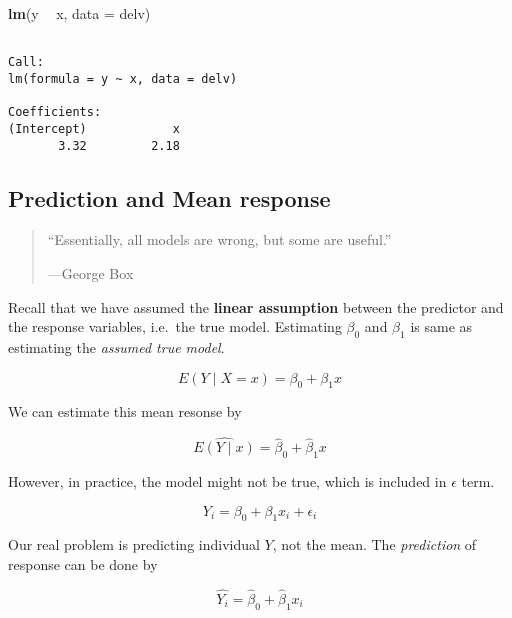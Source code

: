 \documentclass[]{book}
\newenvironment{Shaded}{\begin{snugshade}}{\end{snugshade}}
\newcommand{\KeywordTok}[1]{\textcolor[rgb]{0.13,0.29,0.53}{\textbf{#1}}}
\newcommand{\DataTypeTok}[1]{\textcolor[rgb]{0.13,0.29,0.53}{#1}}
\newcommand{\StringTok}[1]{\textcolor[rgb]{0.31,0.60,0.02}{#1}}
\newcommand{\OperatorTok}[1]{\textcolor[rgb]{0.81,0.36,0.00}{\textbf{#1}}}
\newcommand{\NormalTok}[1]{#1}
\theoremstyle{definition}
\theoremstyle{definition}
\theoremstyle{definition}
\theoremstyle{remark}
\let\BeginKnitrBlock\begin \let\EndKnitrBlock\end
\begin{document}
\begin{Shaded}
\begin{Highlighting}[]
\KeywordTok{lm}\NormalTok{(y }\OperatorTok{~}\StringTok{ }\NormalTok{x, }\DataTypeTok{data =}\NormalTok{ delv)}
\end{Highlighting}
\end{Shaded}

\begin{verbatim}

Call:
lm(formula = y ~ x, data = delv)

Coefficients:
(Intercept)            x  
       3.32         2.18  
\end{verbatim}

\subsection{Prediction and Mean
response}\label{prediction-and-mean-response}

\begin{quote}
``Essentially, all models are wrong, but some are useful.''

---George Box
\end{quote}

Recall that we have assumed the \textbf{linear assumption} between the
predictor and the response variables, i.e.~the true model. Estimating
\(\beta_0\) and \(\beta_1\) is same as estimating the \emph{assumed true
model}.

\BeginKnitrBlock{definition}[Mean response]
\protect\hypertarget{def:eyx}{}{\label{def:eyx} \iffalse (Mean response)
\fi{} }\[E(Y \mid X = x) = \beta_0 + \beta_1 x\]
\EndKnitrBlock{definition}

We can estimate this mean resonse by

\begin{equation}
  \widehat{E(Y \mid x)} = \hat\beta_0 + \hat\beta_1 x
  \label{eq:meanres}
\end{equation}

However, in practice, the model might not be true, which is included in
\(\epsilon\) term.

\[Y_i = \beta_0 + \beta_1 x_i + \epsilon_i\]

Our real problem is predicting individual \(Y\), not the mean. The
\emph{prediction} of response can be done by

\begin{equation}
  \hat{Y_i}  = \hat\beta_0 + \hat\beta_1 x_i
  \label{eq:indpred}
\end{equation}
\end{document}
